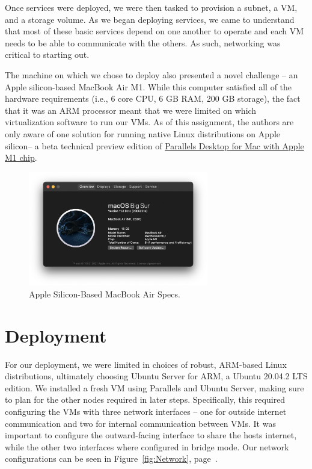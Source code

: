 \documentclass{article}
\begin{document}
Once services were deployed, we were then tasked to provision a subnet, a VM, and a storage volume. As we began deploying services, we came to understand that most of these basic services depend on one another to operate and each VM needs to be able to communicate with the others. As such, networking was critical to starting out.

The machine on which we chose to deploy also presented a novel challenge -- an Apple silicon-based MacBook Air M1. While this computer satisfied all of the hardware requirements (i.e., 6 core CPU, 6 GB RAM, 200 GB storage), the fact that it was an ARM processor meant that we were limited on which virtualization software to run our VMs. As of this assignment, the authors are only aware of one solution for running native Linux distributions on Apple silicon-- a beta technical preview edition of \href{https://www.parallels.com/blogs/parallels-desktop-apple-silicon-mac/}{Parallels Desktop for Mac with Apple M1 chip}.

\begin{figure}[ht]
    \centering
    \includegraphics[width=0.7\textwidth]{AppleSpecs.png}
    \caption{Apple Silicon-Based MacBook Air Specs.}
    \label{fig:AppleSpecs}
\end{figure}






\section{Deployment}
For our deployment, we were limited in choices of robust, ARM-based Linux distributions, ultimately choosing Ubuntu Server for ARM, a Ubuntu 20.04.2 LTS edition. We installed a fresh VM using Parallels and Ubuntu Server, making sure to plan for the other nodes required in later steps. Specifically, this required configuring the VMs with three network interfaces -- one for outside internet communication and two for internal communication between VMs. It was important to configure the outward-facing interface to share the hosts internet, while the other two interfaces where configured in bridge mode. Our network configurations can be seen in Figure~\ref{fig:Network}, page~\pageref{fig:Network}.
\end{document}
